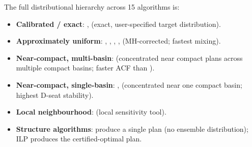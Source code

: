 The full distributional hierarchy across 15 algorithms is:

\begin{itemize}
  \item \textbf{Calibrated / exact}: \smc{}, \smcp{} (exact, user-specified
        target distribution).
  \item \textbf{Approximately uniform}: \fr{}, \msp{}, \vra{}, \ms{}, \ams{}
        (MH-corrected; \ams{} fastest mixing).
  \item \textbf{Near-compact, multi-basin}: \pt{} (concentrated near compact
        plans across multiple compact basins; faster ACF than \sburst{}).
  \item \textbf{Near-compact, single-basin}: \sburst{}, \sburstf{}
        (concentrated near one compact basin; highest D-seat stability).
  \item \textbf{Local neighbourhood}: \flip{} (local sensitivity tool).
  \item \textbf{Structure algorithms}: produce a single plan (no ensemble
        distribution); ILP produces the certified-optimal plan.
\end{itemize}
